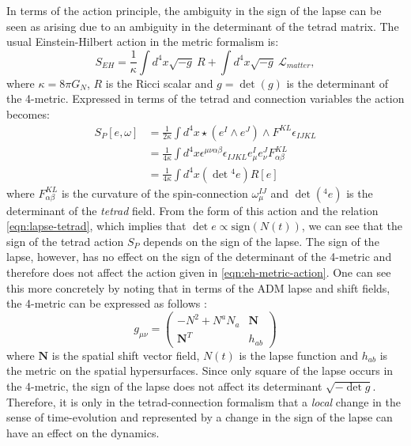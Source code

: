 \documentclass[preprint]{SciPost}
\newcommand{\mb}[1]{\mathbf{#1}}
\newcommand{\mc}[1]{\mathcal{#1}}
\theoremstyle{plain} %
\begin{document}
In terms of the action principle, the ambiguity in the sign of the lapse can be seen as arising due to an ambiguity in the determinant of the tetrad matrix. The usual Einstein-Hilbert action in the metric formalism is:
\begin{equation}\label{eqn:eh-metric-action}
S_{EH} = \frac{1}{\kappa} \int d^4x \sqrt{-g}~R + \int d^4 x \sqrt{-g}~\mc{L}_{matter},
\end{equation}
where $ \kappa = 8 \pi G_N $, $ R $ is the Ricci scalar and $ g = \det(g) $ is the determinant of the 4-metric. Expressed in terms of the tetrad and connection variables \cite[Sec 4.5.3]{Vaid2016LQG-for-the-Bewildered} the action becomes:
\begin{align}
S_{P}[e, \omega] & =\frac{1}{2 \kappa} \int d^{4} x \star\left(e^{I} \wedge e^{J}\right) \wedge F^{K L} \epsilon_{I J K L} \nonumber \\
& = \frac{1}{4 \kappa} \int d^{4} x \epsilon^{\mu \nu \alpha \beta} \epsilon_{I J K L} e_{\mu}^{I} e_{\nu}^{J} F_{\alpha \beta}^{K L} \nonumber \\
& = \frac{1}{4 \kappa} \int d^{4} x (\det {}^4 e) R[e]
\end{align}
where $ F_{\alpha \beta}^{K L} $ is the curvature of the spin-connection $ \omega_\mu^{IJ} $ and $ \det({}^4 e) $ is the determinant of the \emph{tetrad} field. From the form of this action and the relation \eqref{eqn:lapse-tetrad}, which implies that $ \det e \propto \text{sign}(N(t))$, we can see that the sign of the tetrad action $ S_P $ depends on the sign of the lapse. The sign of the lapse, however, has no effect on the sign of the determinant of the 4-metric and therefore does not affect the action given in \eqref{eqn:eh-metric-action}. One can see this more concretely by noting that in terms of the ADM lapse and shift fields, the 4-metric can be expressed as follows \cite[Eq (4.14)]{Vaid2016LQG-for-the-Bewildered}:
\begin{equation}\label{eqn:4-metric-adm}
g_{\mu\nu} = \begin{pmatrix}
-N^2 + N^a N_a & \mb{N} \\
\mb{N}^T	   & h_{ab}
\end{pmatrix}
\end{equation}
where $ \mb{N} $ is the spatial shift vector field, $ N(t) $ is the lapse function and $ h_{ab} $ is the metric on the spatial hypersurfaces. Since only square of the lapse occurs in the 4-metric, the sign of the lapse does not affect its determinant $ \sqrt{-\det{g}} $. Therefore, it is only in the tetrad-connection formalism that a \emph{local} change in the sense of time-evolution and represented by a change in the sign of the lapse can have an effect on the dynamics.
\end{document}
